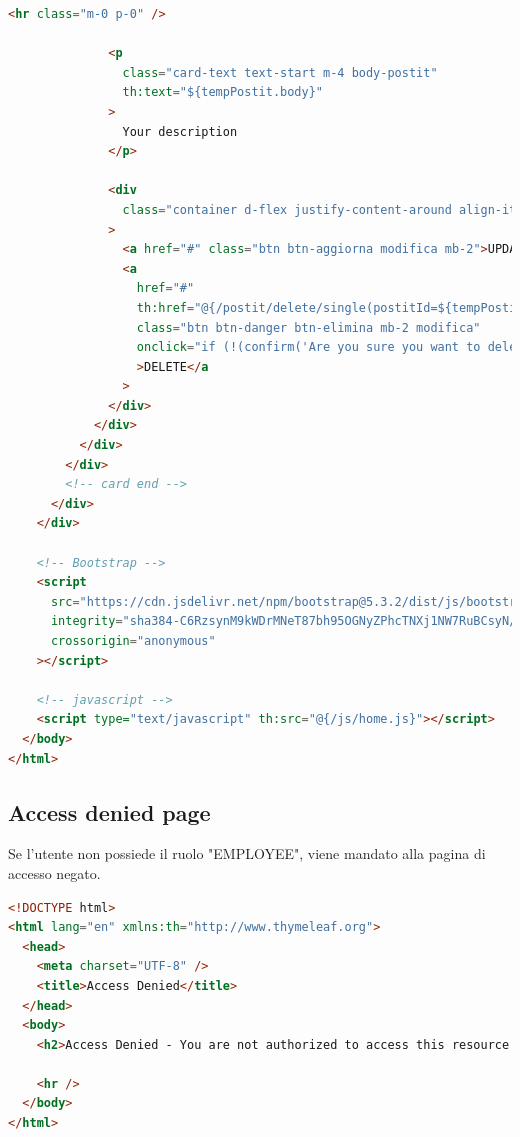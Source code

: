 \begin{lstlisting}[language=html,basicstyle=\tiny, caption={postit-home.html}, captionpos=b]
              <hr class="m-0 p-0" />

              <p
                class="card-text text-start m-4 body-postit"
                th:text="${tempPostit.body}"
              >
                Your description
              </p>

              <div
                class="container d-flex justify-content-around align-items-center pb-3"
              >
                <a href="#" class="btn btn-aggiorna modifica mb-2">UPDATE</a>
                <a
                  href="#"
                  th:href="@{/postit/delete/single(postitId=${tempPostit.id})}"
                  class="btn btn-danger btn-elimina mb-2 modifica"
                  onclick="if (!(confirm('Are you sure you want to delete this postit?'))) return false"
                  >DELETE</a
                >
              </div>
            </div>
          </div>
        </div>
        <!-- card end -->
      </div>
    </div>

    <!-- Bootstrap -->
    <script
      src="https://cdn.jsdelivr.net/npm/bootstrap@5.3.2/dist/js/bootstrap.bundle.min.js"
      integrity="sha384-C6RzsynM9kWDrMNeT87bh95OGNyZPhcTNXj1NW7RuBCsyN/o0jlpcV8Qyq46cDfL"
      crossorigin="anonymous"
    ></script>

    <!-- javascript -->
    <script type="text/javascript" th:src="@{/js/home.js}"></script>
  </body>
</html>

\end{lstlisting}
\subsection{Access denied page}
Se l'utente non possiede il ruolo "EMPLOYEE", viene mandato alla pagina di accesso negato.
\begin{lstlisting}[language=html,basicstyle=\tiny, caption={access-denied.html}, captionpos=b]
<!DOCTYPE html>
<html lang="en" xmlns:th="http://www.thymeleaf.org">
  <head>
    <meta charset="UTF-8" />
    <title>Access Denied</title>
  </head>
  <body>
    <h2>Access Denied - You are not authorized to access this resource.</h2>

    <hr />
  </body>
</html>

\end{lstlisting}
\newpage
